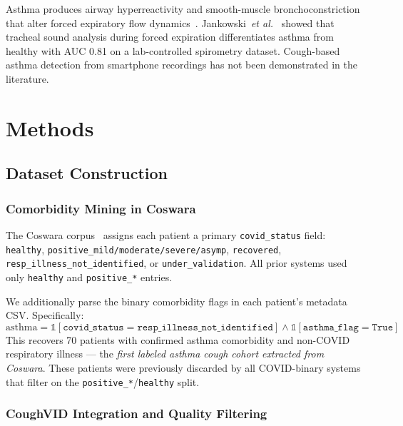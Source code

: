 \documentclass[journal]{IEEEtran}
\begin{document}
Asthma produces airway hyperreactivity and smooth-muscle bronchoconstriction
that alter forced expiratory flow dynamics~\cite{asthma_acoustics}.
Jankowski~\textit{et al.}\ \cite{jankowski_asthma} showed that
tracheal sound analysis during forced expiration differentiates asthma
from healthy with AUC 0.81 on a lab-controlled spirometry dataset.
Cough-based asthma detection from smartphone recordings has not been
demonstrated in the literature.

\section{Methods}
\label{sec:methods}

\subsection{Dataset Construction}
\label{sec:data}

\subsubsection{Comorbidity Mining in Coswara}
\label{sec:comorbidity}

The Coswara corpus~\cite{coswara} assigns each patient a primary
\texttt{covid\_status} field: \texttt{healthy},
\texttt{positive\_mild/moderate/severe/asymp}, \texttt{recovered},
\texttt{resp\_illness\_not\_identified}, or \texttt{under\_validation}.
All prior systems used only \texttt{healthy} and
\texttt{positive\_*} entries.

We additionally parse the binary comorbidity flags in each patient's
metadata CSV. Specifically:
\begin{equation}
\text{asthma} = \mathbb{1}[\texttt{covid\_status} =
  \texttt{resp\_illness\_not\_identified}]
\wedge \mathbb{1}[\texttt{asthma\_flag} = \texttt{True}]
\label{eq:asthma}
\end{equation}
This recovers 70 patients with confirmed asthma comorbidity and
non-COVID respiratory illness — the \emph{first labeled asthma
cough cohort extracted from Coswara}. These patients were previously
discarded by all COVID-binary systems that filter on the
\texttt{positive\_*}/\texttt{healthy} split.

\subsubsection{CoughVID Integration and Quality Filtering}
\label{sec:fusion}
\end{document}
